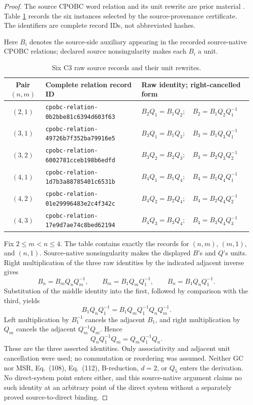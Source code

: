 \documentclass[11pt]{article}
\theoremstyle{definition}
\theoremstyle{remark}
\begin{document}
\begin{proof}
The source CPOBC word relation and its unit rewrite are prior material
\cite[Eqs.~(103), (105), and (115)--(120)]{SrivastavaSurya2026}.  Table
\ref{tab:c3-raw-relations} records the six instances selected by the
source-provenance certificate.  The identifiers are complete record IDs, not
abbreviated hashes.

Here \(B_i\) denotes the source-side auxiliary appearing in the recorded
source-native CPOBC relations; declared source nonsingularity makes each
\(B_i\) a unit.

\begin{table}[ht]
\centering
\footnotesize
\caption{Six C3 raw source records and their unit rewrites.}
\label{tab:c3-raw-relations}
\begin{tabularx}{\textwidth}{@{}c p{} X@{}}
\toprule
Pair \((n,m)\) & Complete relation record ID & Raw identity; right-cancelled form\\
\midrule
\((2,1)\) & \texttt{cpobc-relation-0b2bbe81c6394d603f63}
  & \(B_2Q_1=B_1Q_2;\quad B_2=B_1Q_2Q_1^{-1}\)\\
\((3,1)\) & \texttt{cpobc-relation-49726b7f352ba79916e5}
  & \(B_3Q_1=B_1Q_3;\quad B_3=B_1Q_3Q_1^{-1}\)\\
\((3,2)\) & \texttt{cpobc-relation-6002781cceb198b6edfd}
  & \(B_3Q_2=B_2Q_3;\quad B_3=B_2Q_3Q_2^{-1}\)\\
\((4,1)\) & \texttt{cpobc-relation-1d7b3a88785401c6531b}
  & \(B_4Q_1=B_1Q_4;\quad B_4=B_1Q_4Q_1^{-1}\)\\
\((4,2)\) & \texttt{cpobc-relation-01e29996483e2c4f342c}
  & \(B_4Q_2=B_2Q_4;\quad B_4=B_2Q_4Q_2^{-1}\)\\
\((4,3)\) & \texttt{cpobc-relation-17e9d7ae74c8bed62194}
  & \(B_4Q_3=B_3Q_4;\quad B_4=B_3Q_4Q_3^{-1}\)\\
\bottomrule
\end{tabularx}
\end{table}

Fix \(2\leq m<n\leq4\).  The table contains exactly the records for
\((n,m)\), \((m,1)\), and \((n,1)\).  Source-native nonsingularity makes the
displayed \(B\)'s and \(Q\)'s units.  Right multiplication of the three raw
identities by the indicated adjacent inverse gives
\[
  B_n=B_mQ_nQ_m^{-1},\qquad
  B_m=B_1Q_mQ_1^{-1},\qquad
  B_n=B_1Q_nQ_1^{-1}.
\]
Substitution of the middle identity into the first, followed by comparison
with the third, yields
\[
  B_1Q_nQ_1^{-1}
  =B_1Q_mQ_1^{-1}Q_nQ_m^{-1}.
\]
Left multiplication by \(B_1^{-1}\) cancels the adjacent \(B_1\), and right
multiplication by \(Q_m\) cancels the adjacent \(Q_m^{-1}Q_m\).  Hence
\[
  Q_nQ_1^{-1}Q_m=Q_mQ_1^{-1}Q_n.
\]
These are the three asserted identities.  Only associativity and adjacent
unit cancellation were used; no commutation or reordering was assumed.
Neither GC nor MSR, Eq.~(108), Eq.~(112), B-reduction, \(d=2\), or \(Q_5\)
enters the derivation.  No direct-system point enters either, and this
source-native argument claims no such identity at an arbitrary point of the
direct system without a separately proved source-to-direct binding.
\end{proof}
\end{document}
